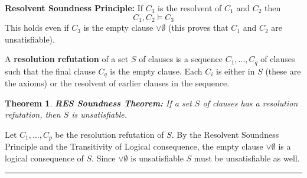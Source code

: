 \documentclass[twoside]{article}
\newcounter{lecnum}
\newtheorem{theorem}{Theorem}[lecnum]
\newenvironment{proof}{{\bf Proof:}}{\hfill\rule{2mm}{2mm}}
\begin{document}
\textbf{Resolvent Soundness Principle:} If $C_3$ is the resolvent of $C_1$ and $C_2$ then
\[C_1, C_2 \vDash C_3\] 
This holds even if $C_3$ is the empty clause $\lor \emptyset$ (this proves that $C_1$ and $C_2$ are unsatisfiable).

A \textbf{resolution refutation} of a set $S$ of clauses is a sequence $C_1, ..., C_q$ of clauses such that the final clause $C_q$ is the empty clause. Each $C_i$ is either in $S$ (these are the axioms) or the resolvent of earlier clauses in the sequence. 

\begin{theorem}
\textbf{RES Soundness Theorem:} If a set $S$ of clauses has a resolution refutation, then $S$ is unsatisfiable. 
\end{theorem}
\begin{proof}
Let $C_1, ..., C_p$ be the resolution refutation of $S$. By the Resolvent Soundness Principle and the Transitivity of Logical consequence, the empty clause $\lor \emptyset$ is a logical consequence of $S$. Since $\lor \emptyset$ is unsatisfiable $S$ must be unsatisfiable as well.  
\end{proof}
\end{document}
